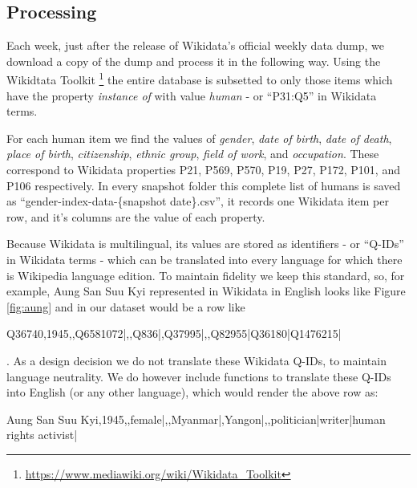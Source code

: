 \documentclass[letterpaper]{article}
\begin{document}
\subsection{Processing}
Each week, just after the release of Wikidata's official weekly data dump, we download a copy of the dump and process it in the following way. Using the Wikidtata Toolkit \footnote{\url{https://www.mediawiki.org/wiki/Wikidata_Toolkit}} the entire database is subsetted to only those items which have the property \textit{instance of} with value \textit{human} - or ``P31:Q5'' in Wikidata terms.

For each human item we find the values of \textit{gender}, \textit{date of birth}, \textit{date of death}, \textit{place of birth}, \textit{citizenship}, \textit{ethnic group}, \textit{field of work}, and \textit{occupation}. These correspond to Wikidata properties P21, P569, P570, P19, P27, P172, P101, and P106 respectively.  In every snapshot folder this complete list of humans is saved as ``gender-index-data-\{snapshot date\}.csv'', it records one Wikidata item per row, and it's columns are the value of each property.

Because Wikidata is multilingual, its values are stored as identifiers - or ``Q-IDs'' in Wikidata terms - which can be translated into every language for which there is Wikipedia language edition. To maintain fidelity we keep this standard, so, for example, Aung San Suu Kyi represented in Wikidata in English looks like Figure \ref{fig:aung} and in our dataset would be a row like \begin{small} Q36740,1945,,Q6581072|,,Q836|,Q37995|,,Q82955|Q36180|Q1476215|
\end{small}. As a design decision we do not translate these Wikidata Q-IDs, to maintain language neutrality. We do however include functions to translate these Q-IDs into English (or any other language), which would render the above row as: \\
\begin{small} Aung San Suu Kyi,1945,,female|,,Myanmar|,Yangon|,,politician|writer|human rights activist|
\end{small}
\end{document}
